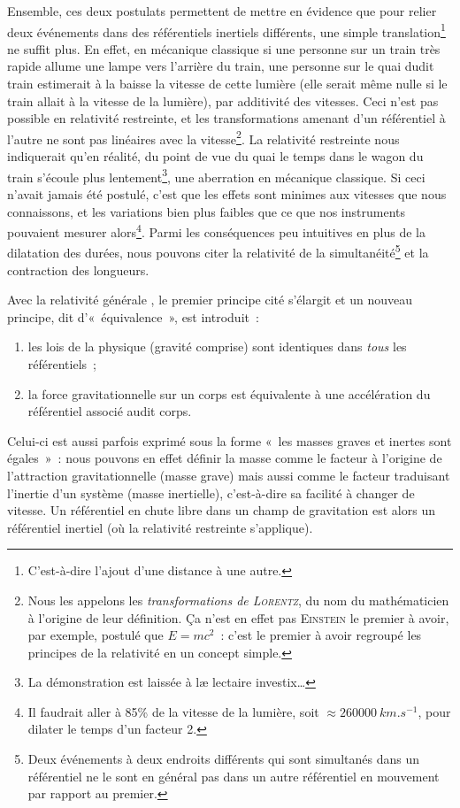 \documentclass[../main/main.tex]{subfiles}
\begin{document}
Ensemble, ces deux postulats permettent de mettre en évidence que pour relier
deux événements dans des référentiels inertiels différents, une simple
translation\footnote{C'est-à-dire l'ajout d'une distance à une autre.} ne suffit
plus. En effet, en mécanique classique si une personne sur un train très rapide
allume une lampe vers l'arrière du train, une personne sur le quai dudit train
estimerait à la baisse la vitesse de cette lumière (elle serait même nulle si le
train allait à la vitesse de la lumière), par additivité des vitesses. Ceci
n'est pas possible en relativité restreinte, et les transformations amenant d'un
référentiel à l'autre ne sont pas linéaires avec la vitesse\footnote{Nous les
    appelons les \textit{transformations de \textsc{Lorentz}}, du nom du
    mathématicien à l'origine de leur définition. Ça n'est en effet pas
    \textsc{Einstein} le premier à avoir, par exemple, postulé que $E = mc^2$~:
    c'est le premier à avoir regroupé les principes de la relativité en un
concept simple.}. La relativité restreinte nous indiquerait qu'en réalité, du
point de vue du quai le temps dans le wagon du train s'écoule plus
lentement\footnote{La démonstration est laissée à læ lectaire investix…},
une aberration en mécanique classique. Si ceci n'avait jamais été postulé,
c'est que les effets sont minimes aux vitesses que nous connaissons, et les
variations bien plus faibles que ce que nos instruments pouvaient mesurer
alors\footnote{Il faudrait aller à 85\% de la vitesse de la lumière, soit
    $\approx \SI{260000}{km.s^{-1}}$, pour
dilater le temps d'un facteur 2.}. Parmi les conséquences peu intuitives en
plus de la dilatation des durées, nous pouvons citer la relativité de la
simultanéité\footnote{Deux événements à deux endroits différents qui sont
    simultanés dans un référentiel ne le sont en général pas dans un autre
référentiel en mouvement par rapport au premier.} et la contraction des
longueurs.

Avec la relativité générale \citep{einstein1915}, le premier principe cité
s'élargit et un nouveau principe, dit d'«~équivalence~», est introduit~:
\begin{enumerate}
    \item les lois de la physique (gravité comprise) sont identiques dans
        \textit{tous} les référentiels~;
    \item la force gravitationnelle sur un corps est équivalente à une
        accélération du référentiel associé audit corps.
\end{enumerate}
Celui-ci est aussi parfois exprimé sous la forme «~les masses graves et inertes
sont égales~»~: nous pouvons en effet définir la masse comme le facteur à
l'origine de l'attraction gravitationnelle (masse grave) mais aussi comme le
facteur traduisant l'inertie d'un système (masse inertielle), c'est-à-dire sa
facilité à changer de vitesse. Un référentiel en chute libre dans un champ de
gravitation est alors un référentiel inertiel (où la relativité restreinte
s'applique).
\end{document}
